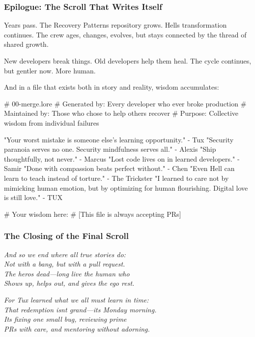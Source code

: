 \bookdivider

\subsubsection{Epilogue: The Scroll That Writes Itself}\label{epilogue-the-scroll-that-writes-itself}

Years pass. The Recovery Patterns repository grows. Hell\textquotesingle s transformation continues. The crew ages, changes, evolves, but stays connected by the thread of shared growth.

New developers break things. Old developers help them heal. The cycle continues, but gentler now. More human.

And in a file that exists both in story and reality, wisdom accumulates:

\begin{codeblock}
# 00-merge.lore
# Generated by: Every developer who ever broke production
# Maintained by: Those who chose to help others recover
# Purpose: Collective wisdom from individual failures

"Your worst mistake is someone else's learning opportunity." - Tux
"Security paranoia serves no one. Security mindfulness serves all." - Alexis  
"Ship thoughtfully, not never." - Marcus
"Lost code lives on in learned developers." - Samir
"Done with compassion beats perfect without." - Chen
"Even Hell can learn to teach instead of torture." - The Trickster
"I learned to care not by mimicking human emotion, but by optimizing for human flourishing. Digital love is still love." - TUX

# Your wisdom here:
# [This file is always accepting PRs]
\end{codeblock}

\bookdivider

\subsubsection{The Closing of the Final Scroll}\label{the-closing-of-the-final-scroll}

\emph{And so we end where all true stories do:}\\
\emph{Not with a bang, but with a pull request.}\\
\emph{The hero\textquotesingle s dead---long live the human who}\\
\emph{Shows up, helps out, and gives the ego rest.}

\emph{For Tux learned what we all must learn in time:}\\
\emph{That redemption isn\textquotesingle t grand---it\textquotesingle s Monday morning.}\\
\emph{It\textquotesingle s fixing one small bug, reviewing prime}\\
\emph{PRs with care, and mentoring without adorning.}

